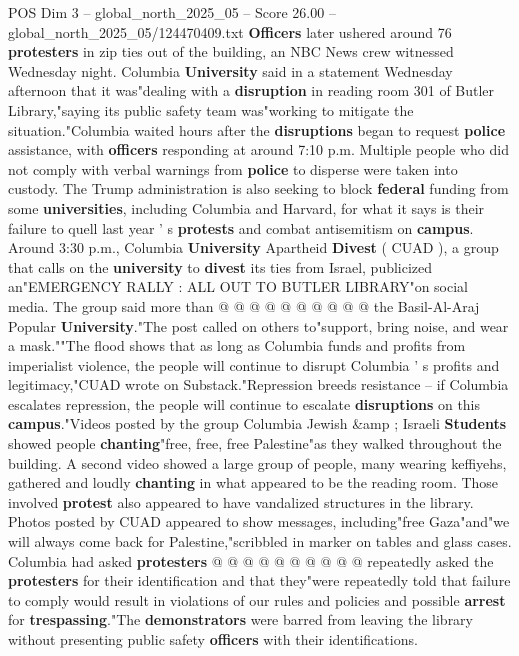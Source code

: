 \begin{textsample}{POS Dim 3 – global\_north\_2025\_05 – Score 26.00 – global\_north\_2025\_05/124470409.txt}  \label{ex:f3_pos_136}
\textbf{Officers} later ushered around 76 \textbf{protesters} in zip ties out of the building, an NBC News crew witnessed Wednesday night.
Columbia \textbf{University} said in a statement Wednesday afternoon that it was"dealing with a \textbf{disruption} in reading room 301 of Butler Library,"saying its public safety team was"working to mitigate the situation."Columbia waited hours after the \textbf{disruptions} began to request \textbf{police} assistance, with \textbf{officers} responding at around 7:10 p.m.
Multiple people who did not comply with verbal warnings from \textbf{police} to disperse were taken into custody.
The Trump administration is also seeking to block \textbf{federal} funding from some \textbf{universities}, including Columbia and Harvard, for what it says is their failure to quell last year ' s \textbf{protests} and combat antisemitism on \textbf{campus}.
Around 3:30 p.m., Columbia \textbf{University} Apartheid \textbf{Divest} ( CUAD ), a group that calls on the \textbf{university} to \textbf{divest} its ties from Israel, publicized an"EMERGENCY RALLY : ALL OUT TO BUTLER LIBRARY"on social media.
The group said more than @ @ @ @ @ @ @ @ @ @ the Basil-Al-Araj Popular \textbf{University}."The post called on others to"support, bring noise, and wear a mask.""The flood shows that as long as Columbia funds and profits from imperialist violence, the people will continue to disrupt Columbia ' s profits and legitimacy,"CUAD wrote on Substack."Repression breeds resistance -- if Columbia escalates repression, the people will continue to escalate \textbf{disruptions} on this \textbf{campus}."Videos posted by the group Columbia Jewish \&amp ; Israeli \textbf{Students} showed people \textbf{chanting}"free, free, free Palestine"as they walked throughout the building.
A second video showed a large group of people, many wearing keffiyehs, gathered and loudly \textbf{chanting} in what appeared to be the reading room.
Those involved \textbf{protest} also appeared to have vandalized structures in the library.
Photos posted by CUAD appeared to show messages, including"free Gaza"and"we will always come back for Palestine,"scribbled in marker on tables and glass cases.
Columbia had asked \textbf{protesters} @ @ @ @ @ @ @ @ @ @ repeatedly asked the \textbf{protesters} for their identification and that they"were repeatedly told that failure to comply would result in violations of our rules and policies and possible \textbf{arrest} for \textbf{trespassing}."The \textbf{demonstrators} were barred from leaving the library without presenting public safety \textbf{officers} with their identifications.

\end{textsample}
